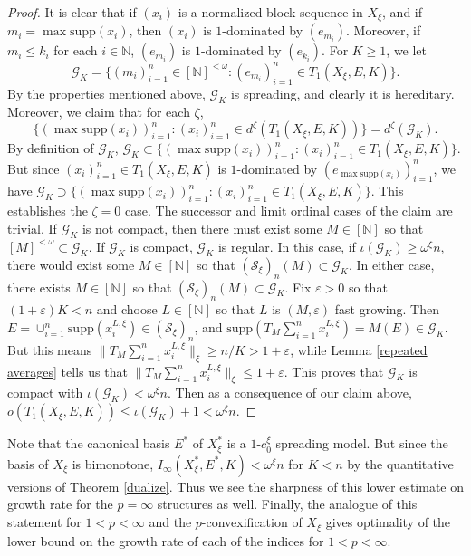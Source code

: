 \documentclass[12pt]{amsart}
\theoremstyle{definition}
\newcommand{\fin}{[\mathbb{N}]^{<\omega}}
\newcommand{\infin}{[\mathbb{N}]}
\newcommand{\nn}{\mathbb{N}}
\newcommand{\gggg}{\mathcal{G}}
\newcommand{\sss}{\mathcal{S}}
\newcommand{\supp}{\mathrm{supp}}
\begin{document}
\begin{proof}

It is clear that if $(x_i)$ is a normalized block sequence in $X_\xi$, and if $m_i=\max \supp(x_i)$, then $(x_i)$ is $1$-dominated by $(e_{m_i})$. Moreover, if $m_i\leqslant k_i$ for each $i\in \nn$, $(e_{m_i})$ is $1$-dominated by $(e_{k_i})$.  For $K\geqslant 1$, we let $$\gggg_K=\{(m_i)_{i=1}^n\in \fin: (e_{m_i})_{i=1}^n\in T_1(X_\xi, E, K)\}.$$  By the properties mentioned above, $\gggg_K$ is spreading, and clearly it is hereditary.  Moreover, we claim that for each $\zeta$, $$\{(\max \supp(x_i))_{i=1}^n: (x_i)_{i=1}^n\in d^\zeta(T_1(X_\xi, E, K))\}= d^\zeta(\gggg_K). $$  By definition of $\gggg_K$, $\gggg_K\subset \{(\max \supp(x_i))_{i=1}^n: (x_i)_{i=1}^n\in T_1(X_\xi, E, K)\}$.  But since $(x_i)_{i=1}^n\in T_1(X_\xi, E, K)$ is $1$-dominated by $(e_{\max \supp(x_i)})_{i=1}^n$, we have $\gggg_K\supset\{(\max \supp(x_i))_{i=1}^n: (x_i)_{i=1}^n\in T_1(X_\xi, E, K)\}$. This establishes the $\zeta=0$ case.  The successor and limit ordinal cases of the claim are trivial.  If $\gggg_K$ is not compact, then there must exist some $M\in \infin$ so that $[M]^{<\omega}\subset \gggg_K$.  If $\gggg_K$ is compact, $\gggg_K$ is regular.  In this case, if $\iota(\gggg_K)\geqslant \omega^\xi n$, there would exist some $M\in \infin$ so that $(\sss_\xi)_n(M)\subset \gggg_K$. In either case, there exists $M\in \infin$ so that $(\sss_\xi)_n(M)\subset \gggg_K$.   Fix $\varepsilon>0$ so that $(1+\varepsilon)K< n$ and choose $L\in \infin$ so that $L$ is $(M, \varepsilon)$ fast growing.  Then $E=\cup_{i=1}^n \supp(x_i^{L, \xi})\in (\sss_\xi)_n$, and $\supp(T_M\sum_{i=1}^n x_i^{L, \xi})=M(E)\in \gggg_K$.  But this means $\|T_M\sum_{i=1}^n x_i^{L, \xi}\|_\xi\geqslant n/K>1+\varepsilon$, while Lemma \ref{repeated averages} tells us that $\|T_M\sum_{i=1}^n x_i^{L, \xi}\|_\xi\leqslant 1+\varepsilon$.  This proves that $\gggg_K$ is compact with $\iota(\gggg_K)<\omega^\xi n$.  Then as a consequence of our claim above, $o(T_1(X_\xi, E, K))\leqslant \iota(\gggg_K)+1<\omega^\xi n$.  



\end{proof}


Note that the canonical basis $E^*$ of $X_\xi^*$ is a $1$-$c_0^\xi$ spreading model.  But since the basis of $X_\xi$ is bimonotone, $I_\infty(X_\xi^*, E^*, K)<\omega^\xi n$ for $K<n$ by the quantitative versions of Theorem \ref{dualize}. Thus we see the sharpness of this lower estimate on growth rate for the $p=\infty$ structures as well.   Finally, the analogue of this statement for $1<p<\infty$ and the $p$-convexification of $X_\xi$ gives optimality of the lower bound on the growth rate of each of the indices for $1<p<\infty$.  
\end{document}
